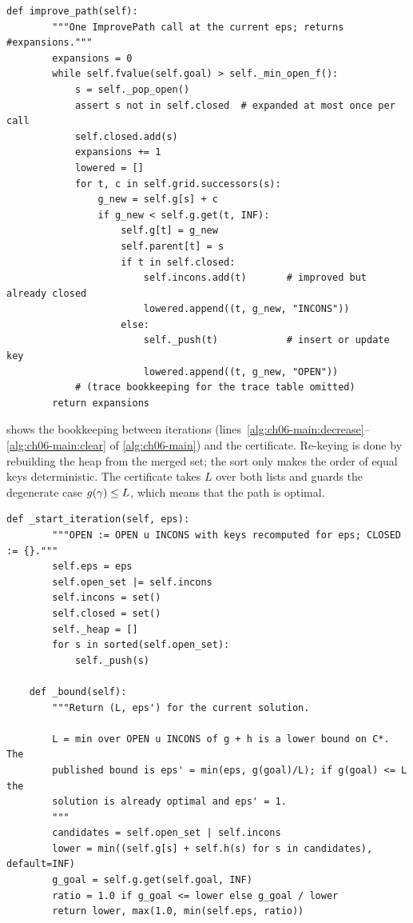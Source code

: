 \begin{lstlisting}[caption={One \code{ImprovePath} call (from \code{code/ch06\_arastar.py}). \code{fvalue} returns $\gcost + \eps\,\hcost$; \code{\_pop\_open} and \code{\_min\_open\_f} skip stale heap entries; the elided \code{trace} block records the rows of \cref{tab:ch06-trace}.},label={lst:ch06-improve}]
    def improve_path(self):
        """One ImprovePath call at the current eps; returns #expansions."""
        expansions = 0
        while self.fvalue(self.goal) > self._min_open_f():
            s = self._pop_open()
            assert s not in self.closed  # expanded at most once per call
            self.closed.add(s)
            expansions += 1
            lowered = []
            for t, c in self.grid.successors(s):
                g_new = self.g[s] + c
                if g_new < self.g.get(t, INF):
                    self.g[t] = g_new
                    self.parent[t] = s
                    if t in self.closed:
                        self.incons.add(t)       # improved but already closed
                        lowered.append((t, g_new, "INCONS"))
                    else:
                        self._push(t)            # insert or update key
                        lowered.append((t, g_new, "OPEN"))
            # (trace bookkeeping for the trace table omitted)
        return expansions
\end{lstlisting}

 shows the bookkeeping between iterations
(lines~\ref{alg:ch06-main:decrease}--\ref{alg:ch06-main:clear} of
\cref{alg:ch06-main}) and the certificate. Re-keying is done by rebuilding
the heap from the merged set; the sort only makes the order of equal keys
deterministic. The certificate takes $L$ over both lists and guards the
degenerate case $g(\gamma) \le L$, which means that the path is
optimal.

\begin{lstlisting}[caption={Start of an iteration and the certificate (from \code{code/ch06\_arastar.py}).},label={lst:ch06-bound}]
    def _start_iteration(self, eps):
        """OPEN := OPEN u INCONS with keys recomputed for eps; CLOSED := {}."""
        self.eps = eps
        self.open_set |= self.incons
        self.incons = set()
        self.closed = set()
        self._heap = []
        for s in sorted(self.open_set):
            self._push(s)

    def _bound(self):
        """Return (L, eps') for the current solution.

        L = min over OPEN u INCONS of g + h is a lower bound on C*.  The
        published bound is eps' = min(eps, g(goal)/L); if g(goal) <= L the
        solution is already optimal and eps' = 1.
        """
        candidates = self.open_set | self.incons
        lower = min((self.g[s] + self.h(s) for s in candidates), default=INF)
        g_goal = self.g.get(self.goal, INF)
        ratio = 1.0 if g_goal <= lower else g_goal / lower
        return lower, max(1.0, min(self.eps, ratio))
\end{lstlisting}

